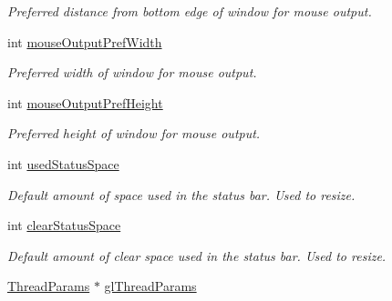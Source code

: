 \begin{DoxyCompactItemize}
\begin{DoxyCompactList}\small\item\em Preferred distance from bottom edge of window for mouse output. \end{DoxyCompactList}\item 
\hypertarget{class_three_d_viewer_a66308587c9e953a2c33a19e0da908339}{
int \hyperlink{class_three_d_viewer_a66308587c9e953a2c33a19e0da908339}{mouseOutputPrefWidth}}
\label{class_three_d_viewer_a66308587c9e953a2c33a19e0da908339}

\begin{DoxyCompactList}\small\item\em Preferred width of window for mouse output. \end{DoxyCompactList}\item 
\hypertarget{class_three_d_viewer_a29a397a18da97f9fc127d559bf975db4}{
int \hyperlink{class_three_d_viewer_a29a397a18da97f9fc127d559bf975db4}{mouseOutputPrefHeight}}
\label{class_three_d_viewer_a29a397a18da97f9fc127d559bf975db4}

\begin{DoxyCompactList}\small\item\em Preferred height of window for mouse output. \end{DoxyCompactList}\item 
\hypertarget{class_three_d_viewer_a3998821904db82bb49a897da24353c08}{
int \hyperlink{class_three_d_viewer_a3998821904db82bb49a897da24353c08}{usedStatusSpace}}
\label{class_three_d_viewer_a3998821904db82bb49a897da24353c08}

\begin{DoxyCompactList}\small\item\em Default amount of space used in the status bar. Used to resize. \end{DoxyCompactList}\item 
\hypertarget{class_three_d_viewer_aa58c57c1708b3eb68ccef47912b7b8c8}{
int \hyperlink{class_three_d_viewer_aa58c57c1708b3eb68ccef47912b7b8c8}{clearStatusSpace}}
\label{class_three_d_viewer_aa58c57c1708b3eb68ccef47912b7b8c8}

\begin{DoxyCompactList}\small\item\em Default amount of clear space used in the status bar. Used to resize. \end{DoxyCompactList}\item 
\hypertarget{class_three_d_viewer_a717ba9e552a9b2e29a33242995440ca5}{
\hyperlink{struct_thread_params}{ThreadParams} $\ast$ \hyperlink{class_three_d_viewer_a717ba9e552a9b2e29a33242995440ca5}{glThreadParams}}
\label{class_three_d_viewer_a717ba9e552a9b2e29a33242995440ca5}


\end{DoxyCompactItemize}
